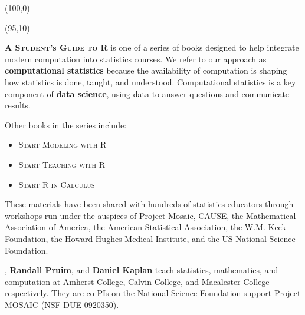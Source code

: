 \documentclass{article}
\begin{document}
\begin{textblock}{6.188}(100,0)
\noindent{}
\end{textblock}

\begin{textblock}{5}(95,10) 
\noindent\parbox{130mm}{

\textsc{\bfseries{A Student's Guide to R}} is one
of a series of books designed to help integrate
modern computation into statistics courses. We refer to our
approach as {\bf computational statistics} because
the availability of computation is shaping how statistics is done,
taught, and understood. Computational statistics is a key component of
{\bf data science}, using data to answer questions and communicate
results. 

\noindent Other books in the series include:
\begin{itemize}
\setlength\itemsep{0mm}
\item \textsc{Start Modeling with R}
\item \textsc{Start Teaching with R}
\item \textsc{Start R in Calculus}
\end{itemize}


These materials have been shared with hundreds of statistics educators
through workshops run under the auspices of Project Mosaic, CAUSE, the
Mathematical Association of America, the American Statistical
Association, the W.M. Keck Foundation, the Howard Hughes Medical
Institute, and the US National
Science Foundation. 


\raggedright
\noindent {}, {\bf Randall Pruim}, and {\bf
Daniel Kaplan} teach statistics, mathematics, and computation at
Amherst College, Calvin College, and Macalester College
respectively.  They are co-PIs on the National Science Foundation
support Project MOSAIC (NSF DUE-0920350).

\medskip

}
\end{textblock}
\end{document}
